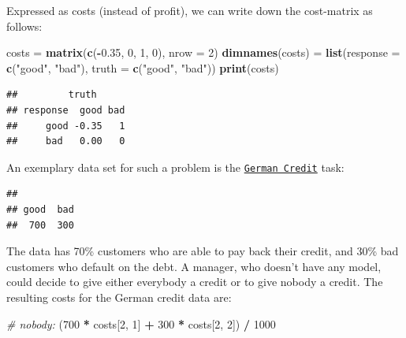 \documentclass[]{article}
\newenvironment{Shaded}{\begin{snugshade}}{\end{snugshade}}
\newcommand{\CommentTok}[1]{\textcolor[rgb]{0.56,0.35,0.01}{\textit{#1}}}
\newcommand{\DataTypeTok}[1]{\textcolor[rgb]{0.13,0.29,0.53}{#1}}
\newcommand{\DecValTok}[1]{\textcolor[rgb]{0.00,0.00,0.81}{#1}}
\newcommand{\FloatTok}[1]{\textcolor[rgb]{0.00,0.00,0.81}{#1}}
\newcommand{\KeywordTok}[1]{\textcolor[rgb]{0.13,0.29,0.53}{\textbf{#1}}}
\newcommand{\NormalTok}[1]{#1}
\newcommand{\OperatorTok}[1]{\textcolor[rgb]{0.81,0.36,0.00}{\textbf{#1}}}
\newcommand{\StringTok}[1]{\textcolor[rgb]{0.31,0.60,0.02}{#1}}
\renewenvironment{Shaded} {\begin{snugshade}\small} {\end{snugshade}}
\begin{document}
Expressed as costs (instead of profit), we can write down the cost-matrix as follows:

\begin{Shaded}
\begin{Highlighting}[]
\NormalTok{costs =}\StringTok{ }\KeywordTok{matrix}\NormalTok{(}\KeywordTok{c}\NormalTok{(}\OperatorTok{-}\FloatTok{0.35}\NormalTok{, }\DecValTok{0}\NormalTok{, }\DecValTok{1}\NormalTok{, }\DecValTok{0}\NormalTok{), }\DataTypeTok{nrow =} \DecValTok{2}\NormalTok{)}
\KeywordTok{dimnames}\NormalTok{(costs) =}\StringTok{ }\KeywordTok{list}\NormalTok{(}\DataTypeTok{response =} \KeywordTok{c}\NormalTok{(}\StringTok{"good"}\NormalTok{, }\StringTok{"bad"}\NormalTok{), }\DataTypeTok{truth =} \KeywordTok{c}\NormalTok{(}\StringTok{"good"}\NormalTok{, }\StringTok{"bad"}\NormalTok{))}
\KeywordTok{print}\NormalTok{(costs)}
\end{Highlighting}
\end{Shaded}

\begin{verbatim}
##         truth
## response  good bad
##     good -0.35   1
##     bad   0.00   0
\end{verbatim}

An exemplary data set for such a problem is the \href{https://mlr3.mlr-org.com/reference/mlr_tasks_german_credit.html}{\texttt{German\ Credit}} task:

\begin{Shaded}
\end{Shaded}

\begin{verbatim}
## 
## good  bad 
##  700  300
\end{verbatim}

The data has 70\% customers who are able to pay back their credit, and 30\% bad customers who default on the debt.
A manager, who doesn't have any model, could decide to give either everybody a credit or to give nobody a credit.
The resulting costs for the German credit data are:

\begin{Shaded}
\begin{Highlighting}[]
\CommentTok{# nobody:}
\NormalTok{(}\DecValTok{700} \OperatorTok{*}\StringTok{ }\NormalTok{costs[}\DecValTok{2}\NormalTok{, }\DecValTok{1}\NormalTok{] }\OperatorTok{+}\StringTok{ }\DecValTok{300} \OperatorTok{*}\StringTok{ }\NormalTok{costs[}\DecValTok{2}\NormalTok{, }\DecValTok{2}\NormalTok{]) }\OperatorTok{/}\StringTok{ }\DecValTok{1000}
\end{Highlighting}
\end{Shaded}
\end{document}
